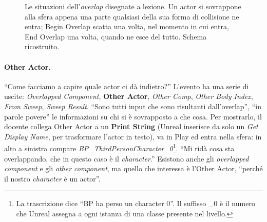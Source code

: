 \begin{figure}[htbp]
\centering
{}
\caption{Le situazioni dell'\emph{overlap} disegnate a lezione. Un actor si sovrappone
alla sfera appena una parte qualsiasi della sua forma di collisione ne entra; Begin
Overlap scatta una volta, nel momento in cui entra, End Overlap una volta, quando ne
esce del tutto. Schema ricostruito.}
\label{ue4:fig:overlap}
\end{figure}

\paragraph{Other Actor.} ``Come facciamo a capire quale actor ci dà indietro?'' L'evento
ha una serie di uscite: \emph{Overlapped Component}, \textbf{Other Actor}, \emph{Other
Comp}, \emph{Other Body Index}, \emph{From Sweep}, \emph{Sweep Result}. ``Sono tutti
input che sono risultanti dall'overlap'', ``in parole povere'' le informazioni su chi si
è sovrapposto a che cosa. Per mostrarlo, il docente collega Other Actor a un
\textbf{Print String} (Unreal inserisce da solo un \emph{Get Display Name}, per
trasformare l'actor in testo), va in Play ed entra nella sfera: in alto a sinistra
compare \emph{BP\_ThirdPersonCharacter\_0}\footnote{La trascrizione dice ``BP ha perso
un character 0''. Il suffisso \_0 è il numero che Unreal assegna a ogni istanza di una
classe presente nel livello.}. ``Mi ridà cosa sta overlappando, che in questo caso è il
\emph{character}.'' Esistono anche gli \emph{overlapped component} e gli \emph{other
component}, ma quello che interessa è l'Other Actor, ``perché il nostro
\emph{character} è un actor''.

